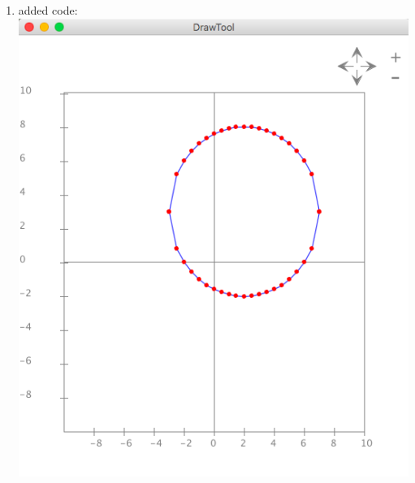 \documentclass{article}
\begin{document}
\begin{enumerate}
\item added code:\\
\includegraphics[scale=0.4]{exercise21} 


\end{enumerate}
\end{document}
